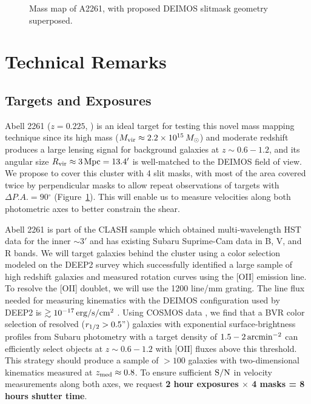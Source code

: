 \documentclass[12pt]{article}
\newcommand{\degr}{\ensuremath{^\circ}}
\begin{document}
\begin{figure}[H]
\begin{minipage}{0.45\linewidth}
\begin{center}
    \caption{\footnotesize Mass map of A2261, with proposed DEIMOS slitmask geometry superposed.}
    \label{fig:maskoverlay}
    \end{center}
  \end{minipage}
\end{figure}


\renewcommand{\bibfont}{\small}
\begin{spacing}{0}


\end{spacing}

\newpage

\section{Technical Remarks}

\subsection{Targets and Exposures}

Abell 2261 ($z=0.225$, \citealt{Coe2012}) is an ideal target for testing this novel mass mapping technique since its high mass ($M_{\rm vir}\approx 2.2 \times 10^{15}\,M_{\odot}$) and moderate redshift produces a large lensing signal for background galaxies at $z\sim0.6-1.2$, and its angular size $R_{\rm vir} \approx 3\,{\rm Mpc} = 13.4'$ is well-matched to the DEIMOS field of view. We propose to cover this cluster with 4 slit masks, with most of the area covered twice by perpendicular masks to allow repeat observations of targets with $\Delta P.A.=90\degr$ (Figure~\ref{fig:maskoverlay}). This will enable us to measure velocities along both photometric axes to better constrain the shear.

Abell 2261 is part of the CLASH sample \citep{Postman2012} which obtained multi-wavelength HST data for the inner $\sim3'$ and has existing Subaru Suprime-Cam data in B, V, and R bands. We will target galaxies behind the cluster using a color selection modeled on the DEEP2 survey \citep{Newman2013} which successfully identified a large sample of high redshift galaxies and measured rotation curves using the [OII] emission line. To resolve the [OII] doublet, we will use the 1200 line/mm grating. The line flux needed for measuring kinematics with the DEIMOS configuration used by DEEP2 is $\gtrsim10^{-17}\,{\rm erg/s/cm^2}$ \citep{Kassin2012}. Using COSMOS data \citep{Jouvel2009}, we find that a BVR color selection of resolved ($r_{1/2}>0.5"$) galaxies with exponential surface-brightness profiles from Subaru photometry with a target density of $1.5-2\,{\rm arcmin^{-2}}$ can efficiently select objects at $z\sim0.6-1.2$ with [OII] fluxes above this threshold. This strategy should produce a sample of $>100$ galaxies with two-dimensional kinematics measured at $z_{\rm med}\approx0.8$. To ensure sufficient ${\rm S/N}$ in velocity measurements along both axes, we request \textbf{2 hour exposures $\times$ 4 masks = 8 hours shutter time}.
\end{document}
